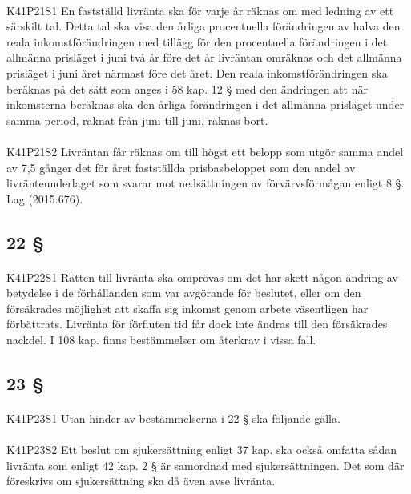 \documentclass[a4paper,notitlepage,openany,10pt]{book}
\begin{document}
\paragraph*{}
{\tiny K41P21S1}
En fastställd livränta ska för varje år räknas om med ledning av ett särskilt tal. Detta tal ska visa den årliga procentuella förändringen av halva den reala inkomstförändringen med tillägg för den procentuella förändringen i det allmänna prisläget i juni två år före det år livräntan omräknas och det allmänna prisläget i juni året närmast före det året. Den reala inkomstförändringen ska beräknas på det sätt som anges i 58 kap. 12 § med den ändringen att när inkomsterna beräknas ska den årliga förändringen i det allmänna prisläget under samma period, räknat från juni till juni, räknas bort.
\paragraph*{}
{\tiny K41P21S2}
Livräntan får räknas om till högst ett belopp som utgör samma andel av 7,5 gånger det för året fastställda prisbasbeloppet som den andel av livränteunderlaget som svarar mot nedsättningen av förvärvsförmågan enligt 8 §.
Lag (2015:676).
\subsection*{22 §}
\paragraph*{}
{\tiny K41P22S1}
Rätten till livränta ska omprövas om det har skett någon ändring av betydelse i de förhållanden som var avgörande för beslutet, eller om den försäkrades möjlighet att skaffa sig inkomst genom arbete väsentligen har förbättrats. Livränta för förfluten tid får dock inte ändras till den försäkrades nackdel. I 108 kap. finns bestämmelser om återkrav i vissa fall.
\subsection*{23 §}
\paragraph*{}
{\tiny K41P23S1}
Utan hinder av bestämmelserna i 22 § ska följande gälla.
\paragraph*{}
{\tiny K41P23S2}
Ett beslut om sjukersättning enligt 37 kap. ska också omfatta sådan livränta som enligt 42 kap. 2 § är samordnad med sjukersättningen. Det som där föreskrivs om sjukersättning ska då även avse livränta.
\end{document}
